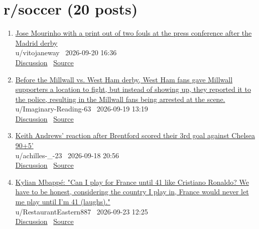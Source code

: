 \documentclass[11pt,a4paper]{article}
\begin{document}
\section*{r/soccer \normalsize(20 posts)}
\begin{enumerate}
  \item \href{https://www.reddit.com/r/soccer/comments/1wllt19/jose_mourinho_with_a_print_out_of_two_fouls_at/}{Jose Mourinho with a print out of two fouls at the press conference after the Madrid derby}\\ {\small u/vitojaneway \textbullet\ 2026-09-20 16:36}\\ {\small \href{https://www.reddit.com/r/soccer/comments/1wllt19/jose_mourinho_with_a_print_out_of_two_fouls_at/}{Discussion} \textbullet\ \href{https://i.redd.it/mkq9aa7fdpqh1.png}{Source}}
  \item \href{https://www.reddit.com/r/soccer/comments/1wkm2vc/before_the_millwall_vs_west_ham_derby_west_ham/}{Before the Millwall vs. West Ham derby, West Ham fans gave Millwall supporters a location to fight, but instead of showing up, they reported it to the police, resulting in the Millwall fans being arrested at the scene.}\\ {\small u/Imaginary-Reading-63 \textbullet\ 2026-09-19 13:19}\\ {\small \href{https://www.reddit.com/r/soccer/comments/1wkm2vc/before_the_millwall_vs_west_ham_derby_west_ham/}{Discussion} \textbullet\ \href{https://v.redd.it/lv68185n9hqh1}{Source}}
  \item \href{https://www.reddit.com/r/soccer/comments/1wk27i9/keith_andrews_reaction_after_brentford_scored/}{Keith Andrews' reaction after Brentford scored their 3rd goal against Chelsea 90+5'}\\ {\small u/achilles-\_-23 \textbullet\ 2026-09-18 20:56}\\ {\small \href{https://www.reddit.com/r/soccer/comments/1wk27i9/keith_andrews_reaction_after_brentford_scored/}{Discussion} \textbullet\ \href{https://v.redd.it/u1c0s029ecqh1}{Source}}
  \item \href{https://www.reddit.com/r/soccer/comments/1wo4k91/kylian_mbappé_can_i_play_for_france_until_41_like/}{Kylian Mbappé: "Can I play for France until 41 like Cristiano Ronaldo? We have to be honest, considering the country I play in, France would never let me play until I'm 41 (laughs)."}\\ {\small u/RestaurantEastern887 \textbullet\ 2026-09-23 12:25}\\ {\small \href{https://www.reddit.com/r/soccer/comments/1wo4k91/kylian_mbappé_can_i_play_for_france_until_41_like/}{Discussion} \textbullet\ \href{https://en.as.com/soccer/mbappe-explains-his-stance-on-olise-to-real-madrid-move-speculation-i-think-it-would-be-disrespectful-f202609-n/}{Source}}

\end{enumerate}
\end{document}
